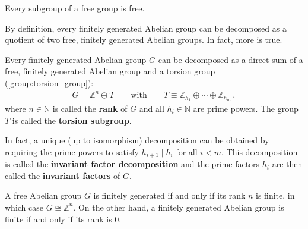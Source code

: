     \begin{property}
        Every subgroup of a free group is free.
    \end{property}

    By definition, every finitely generated Abelian group can be decomposed as a quotient of two free, finitely generated Abelian groups. In fact, more is true.
    \begin{theorem}\label{group:theorem:free_group}
        Every finitely generated Abelian group $G$ can be decomposed as a direct sum of a free, finitely generated Abelian group and a torsion group (\cref{group:torsion_group}):
        \begin{gather}
            G = \mathbb{Z}^n\oplus T \qquad\text{with}\qquad T\equiv \mathbb{Z}_{h_1}\oplus\cdots\oplus \mathbb{Z}_{h_m}\,,
        \end{gather}
        where $n\in\mathbb{N}$ is called the \textbf{rank} of $G$ and all $h_i\in\mathbb{N}$ are prime powers. The group $T$ is called the \textbf{torsion subgroup}.

        In fact, a unique (up to isomorphism) decomposition can be obtained by requiring the prime powers to satisfy $h_{i+1}\mid h_i$ for all $i<m$. This decomposition is called the \textbf{invariant factor decomposition} and the prime factors $h_i$ are then called the \textbf{invariant factors} of $G$.
    \end{theorem}

    \begin{property}
        A free Abelian group $G$ is finitely generated if and only if its rank $n$ is finite, in which case $G\cong\mathbb{Z}^n$. On the other hand, a finitely generated Abelian group is finite if and only if its rank is 0.
    \end{property}

